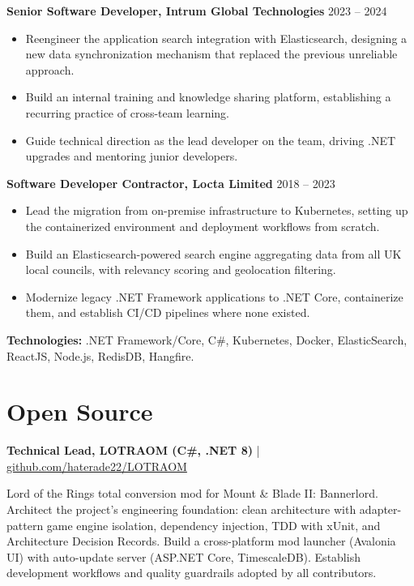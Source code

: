 \documentclass[11pt,a4paper]{article}
\begin{document}
\vfill

\textbf{Senior Software Developer, Intrum Global Technologies} \hfill 2023 -- 2024
\begin{itemize}
\item Reengineer the application search integration with Elasticsearch, designing a new data synchronization mechanism that replaced the previous unreliable approach.
\item Build an internal training and knowledge sharing platform, establishing a recurring practice of cross-team learning.
\item Guide technical direction as the lead developer on the team, driving .NET upgrades and mentoring junior developers.
\end{itemize}

\vfill

\textbf{Software Developer Contractor, Locta Limited} \hfill 2018 -- 2023
\begin{itemize}
\item Lead the migration from on-premise infrastructure to Kubernetes, setting up the containerized environment and deployment workflows from scratch.
\item Build an Elasticsearch-powered search engine aggregating data from all UK local councils, with relevancy scoring and geolocation filtering.
\item Modernize legacy .NET Framework applications to .NET Core, containerize them, and establish CI/CD pipelines where none existed.
\end{itemize}
\textbf{Technologies:} .NET Framework/Core, C\#, Kubernetes, Docker, ElasticSearch, ReactJS, Node.js, RedisDB, Hangfire.

\vfill

\newpage

\section{Open Source}

\textbf{Technical Lead, LOTRAOM (C\#, .NET 8)} | \href{https://github.com/haterade22/LOTRAOM}{github.com/haterade22/LOTRAOM}

\smallskip
Lord of the Rings total conversion mod for Mount \& Blade II: Bannerlord. Architect the project's engineering foundation: clean architecture with adapter-pattern game engine isolation, dependency injection, TDD with xUnit, and Architecture Decision Records. Build a cross-platform mod launcher (Avalonia UI) with auto-update server (ASP.NET Core, TimescaleDB). Establish development workflows and quality guardrails adopted by all contributors.
\end{document}
